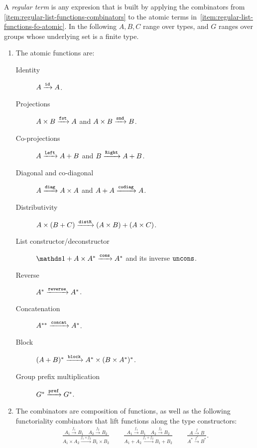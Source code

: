 \begin{definition} \label{def:regular-terms} A \emph{regular term} is any expresion that is built by applying the combinators from \cref{item:regular-list-functions-combinators} to the atomic terms in~\cref{item:regular-list-functions-fo-atomic}. In the following $A,B,C$ range over types, and $G$ ranges over groups whose underlying set is a finite type. 
    \begin{enumerate}
        \item \label{item:regular-list-functions-fo-atomic}     The atomic functions are:
    \begin{description}
        \item[Identity]  $A \xrightarrow {\mathtt{id}} A$.
        \item[Projections]  $A \times B \xrightarrow {\mathtt{fst}} A$ and $A \times B \xrightarrow {\mathtt{snd}} B$.
        \item[Co-projections] $A \xrightarrow {\mathtt{Left}} A + B$ and $B \xrightarrow {\mathtt{Right}} A + B$.
        \item[Diagonal and co-diagonal]  $A \xrightarrow {\mathtt{diag}} A \times A$ and   $A + A \xrightarrow {\mathtt{codiag}} A$.
        \item[Distributivity]  $A \times (B + C) \xrightarrow {\mathtt{distR}} (A \times B) + (A \times C)$. 
        \item[List constructor/deconstructor] $\onetype + A \times A^* \xrightarrow {\consterm} A^*$ and its inverse $\mathtt{uncons}$. 
        \item[Reverse]  $A^* \xrightarrow{\mathtt{reverse}} A^*$.
        \item[Concatenation] $A^{**} \xrightarrow{\mathtt{concat}} A^*$.
        \item[Block] $(A+B)^* \xrightarrow{\mathtt{block}} A^* \times (B \times A^*)^*$.
        \item[Group prefix multiplication] $G^* \xrightarrow{\mathtt{pref}} G^*$.
    \end{description}
    
            \item \label{item:regular-list-functions-combinators} The combinators are composition of functions, as well as the following functoriality combinators that lift functions along the type constructors:
        \begin{align*}
        \frac{ A_1 \xrightarrow {f_1} B_1 \quad A_2 \xrightarrow {f_2} B_2}
        { A_1 \times A_2 \xrightarrow {f_1 \times f_2} B_1 \times B_2}
        \qquad 
                \frac{ A_1 \xrightarrow {f_1} B_1 \quad A_2 \xrightarrow {f_2} B_2}
        { A_1 + A_2 \xrightarrow {f_1 + f_2} B_1 + B_2}
        \qquad 
        \frac { A \xrightarrow f B}
        { A^* \xrightarrow {f^*} B^*}.
        \end{align*}
    \end{enumerate}
\end{definition}

